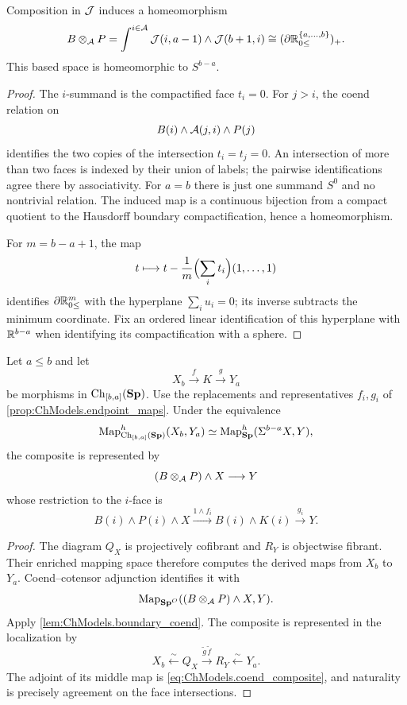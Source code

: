 \begin{lem}\label{lem:ChModels.boundary_coend}
    Composition in $\mathcal{J}$ induces a homeomorphism
    \[
        B\otimes_{\mathcal{A}}P
        =\int^{i\in\mathcal{A}}\mathcal{J}(i,a-1)\wedge\mathcal{J}(b+1,i)
        \cong(\partial\mathbb{R}_{0 \leq}^{\{a,\ldots,b\}})_+.
    \]
    This based space is homeomorphic to $S^{b-a}$.
\end{lem}
\begin{proof}
    The $i$-summand is the compactified face $t_i=0$. For $j>i$, the coend relation on
    \[
        B(i)\wedge\mathcal{A}(j,i)\wedge P(j)
    \]
    identifies the two copies of the intersection $t_i=t_j=0$. An intersection of more than two faces is indexed by their union of labels; the pairwise identifications agree there by associativity. For $a=b$ there is just one summand $S^0$ and no nontrivial relation. The induced map is a continuous bijection from a compact quotient to the Hausdorff boundary compactification, hence a homeomorphism.

    For $m=b-a+1$, the map
    \[
        t\longmapsto t-\frac{1}{m}\Bigl(\sum_i t_i\Bigr)(1,\ldots,1)
    \]
    identifies $\partial\mathbb{R}_{0 \leq}^m$ with the hyperplane $\sum_i u_i=0$; its inverse subtracts the minimum coordinate. Fix an ordered linear identification of this hyperplane with $\mathbb{R}^{b-a}$ when identifying its compactification with a sphere.
\end{proof}

\begin{prop}\label{prop:ChModels.composition}
    Let $a\leq b$ and let
    \[
        X_b\xrightarrow{f}K\xrightarrow{g}Y_a
    \]
    be morphisms in $\operatorname{Ch}_{[b,a]}(\mathbf{Sp})$. Use the replacements and representatives $f_i,g_i$ of \cref{prop:ChModels.endpoint_maps}. Under the equivalence
    \[
        \operatorname{Map}^h_{\operatorname{Ch}_{[b,a]}(\mathbf{Sp})}(X_b,Y_a)
        \simeq\operatorname{Map}^h_{\mathbf{Sp}}(\Sigma^{b-a}X,Y),
    \]
    the composite is represented by
    \begin{equation}\label{eq:ChModels.coend_composite}
        (B\otimes_{\mathcal{A}}P)\wedge X\longrightarrow Y
    \end{equation}
    whose restriction to the $i$-face is
    \begin{equation}\label{eq:ChModels.face_composite}
        B(i)\wedge P(i)\wedge X
        \xrightarrow{1\wedge f_i}B(i)\wedge K(i)
        \xrightarrow{g_i}Y.
    \end{equation}
\end{prop}
\begin{proof}
    The diagram $Q_X$ is projectively cofibrant and $R_Y$ is objectwise fibrant. Their enriched mapping space therefore computes the derived maps from $X_b$ to $Y_a$. Coend--cotensor adjunction identifies it with
    \[
        \operatorname{Map}_{\mathbf{Sp}^O}((B\otimes_{\mathcal{A}}P)\wedge X,Y).
    \]
    Apply \cref{lem:ChModels.boundary_coend}. The composite is represented in the localization by
    \[
        X_b\xleftarrow{\sim}Q_X
        \xrightarrow{\widetilde g\,\widetilde f}R_Y
        \xleftarrow{\sim}Y_a.
    \]
    The adjoint of its middle map is \cref{eq:ChModels.coend_composite}, and naturality is precisely agreement on the face intersections.
\end{proof}

